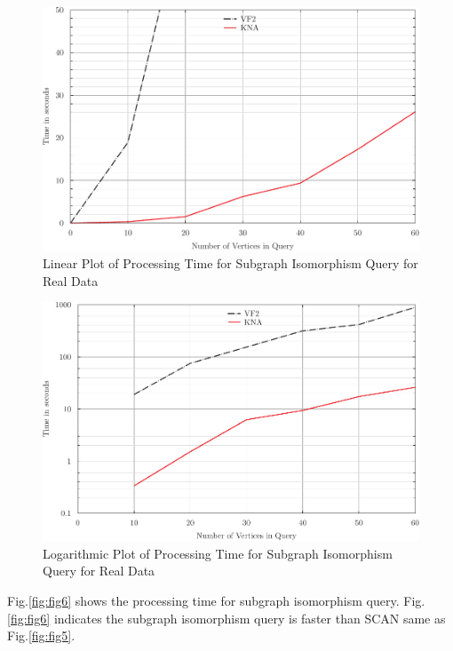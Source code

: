 \begin{figure}[h]
\centering
\centerline{\includegraphics{images/kna_non_inducedR}}
\caption{Linear Plot of Processing Time for Subgraph Isomorphism Query for Real Data}
\label{fig:fig11}
\end{figure}

\begin{figure}[h]
\centering
\centerline{\includegraphics{images/kna_non_induced_logR}}
\caption{Logarithmic Plot of Processing Time for Subgraph Isomorphism Query for Real Data}
\label{fig:fig12}
\end{figure}


Fig.\ref{fig:fig6} shows the processing time for subgraph isomorphism query.
Fig.\ref{fig:fig6} indicates the subgraph isomorphism query is faster than SCAN same as Fig.\ref{fig:fig5}.


